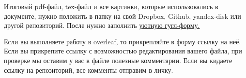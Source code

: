 \documentclass[12pt, a4paper, oneside]{article}
\begin{document}
Итоговый pdf-файл, tex-файл и все картинки, которые использовались в документе, нужно положить в папку на свой Dropbox, Github, yandex-disk или другой репозиторий. После нужно заполнить \href{https://docs.google.com/forms/d/e/1FAIpQLSe11kxKVfv07iCL1E9yNX7ll9swKImiVwRr1H70lslGzInRSg/viewform}{уютную гугл-форму.}  

Если вы выполняете работу в overleaf, то прикрепляйте в форму ссылку на неё. Если вы прикрепите ссылку с возможностью редактирования вашего файла, при проверке мы оставим у вас в файле полезные комментарии. Если вы кидаете ссылку на репозиторий, все комменты отправим в личку.
\end{document}
